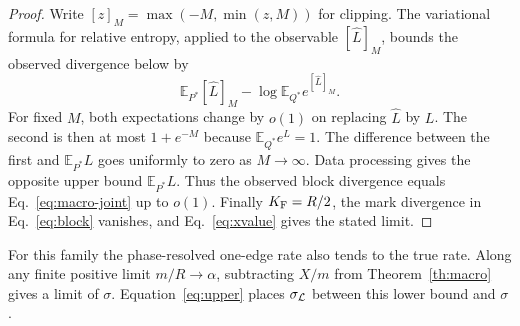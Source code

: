 \begin{proof}
Write $[z]_M=\max(-M,\min(z,M))$ for clipping. The variational formula for relative entropy, applied to the observable $[\widehat L]_M$, bounds the observed divergence below by
\[
 {\mathbb E}_{P^*}[\widehat L]_M
       -\log {\mathbb E}_{Q^*}e^{[\widehat L]_M}.
\]
For fixed $M$, both expectations change by $o(1)$ on replacing $\widehat L$ by $L$. The second is then at most $1+e^{-M}$ because $\mathbb E_{Q^*}e^L=1$. The difference between the first and $\mathbb E_{P^*}L$ goes uniformly to zero as $M\to\infty$. Data processing gives the opposite upper bound $\mathbb E_{P^*} L$. Thus the observed block divergence equals Eq.~\eqref{eq:macro-joint} up to $o(1)$. Finally $K_\mathrm F=R/2$, the mark divergence in Eq.~\eqref{eq:block} vanishes, and Eq.~\eqref{eq:xvalue} gives the stated limit.
\end{proof}

For this family the phase-resolved one-edge rate also tends to the true rate. Along any finite positive limit $m/R\to\alpha$, subtracting $X/m$ from Theorem~\ref{th:macro} gives a limit of $\sigma$. Equation~\eqref{eq:upper} places $\sigma_{\cal L}$ between this lower bound and $\sigma$.

